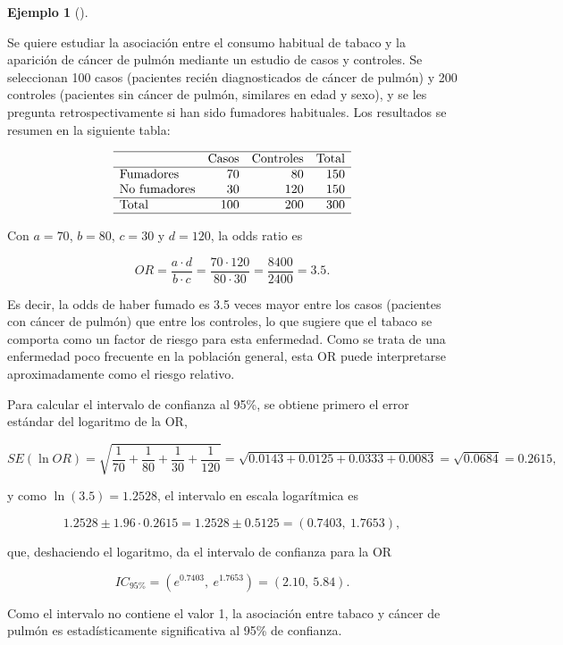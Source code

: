 \documentclass[
  spanish,
  a4paper,
]{scrreport}
\theoremstyle{definition}
\newtheorem{example}{Ejemplo}[chapter]
\theoremstyle{definition}
\theoremstyle{remark}
\begin{document}
\begin{example}[]\protect\hypertarget{exm-casoscontroles-odds-ratio}{}\label{exm-casoscontroles-odds-ratio}

Se quiere estudiar la asociación entre el consumo habitual de tabaco y
la aparición de cáncer de pulmón mediante un estudio de casos y
controles. Se seleccionan 100 casos (pacientes recién diagnosticados de
cáncer de pulmón) y 200 controles (pacientes sin cáncer de pulmón,
similares en edad y sexo), y se les pregunta retrospectivamente si han
sido fumadores habituales. Los resultados se resumen en la siguiente
tabla:

\[
\begin{array}{lrrr}
\hline
 & \mbox{Casos} & \mbox{Controles} & \mbox{Total}\\
\hline
\mbox{Fumadores} & 70 & 80 & 150\\
\mbox{No fumadores} & 30 & 120 & 150\\
\hline
\mbox{Total} & 100 & 200 & 300\\
\hline
\end{array}
\]

Con \(a=70\), \(b=80\), \(c=30\) y \(d=120\), la odds ratio es

\[OR = \frac{a\cdot d}{b\cdot c} = \frac{70\cdot 120}{80\cdot 30} = \frac{8400}{2400} = 3.5.\]

Es decir, la odds de haber fumado es 3.5 veces mayor entre los casos
(pacientes con cáncer de pulmón) que entre los controles, lo que sugiere
que el tabaco se comporta como un factor de riesgo para esta enfermedad.
Como se trata de una enfermedad poco frecuente en la población general,
esta OR puede interpretarse aproximadamente como el riesgo relativo.

Para calcular el intervalo de confianza al 95\%, se obtiene primero el
error estándar del logaritmo de la OR,

\[SE(\ln OR) = \sqrt{\frac{1}{70}+\frac{1}{80}+\frac{1}{30}+\frac{1}{120}} = \sqrt{0.0143+0.0125+0.0333+0.0083} = \sqrt{0.0684} = 0.2615,\]

y como \(\ln(3.5) = 1.2528\), el intervalo en escala logarítmica es

\[1.2528 \pm 1.96\cdot 0.2615 = 1.2528 \pm 0.5125 = (0.7403,\ 1.7653),\]

que, deshaciendo el logaritmo, da el intervalo de confianza para la OR

\[IC_{95\%} = (e^{0.7403},\ e^{1.7653}) = (2.10,\ 5.84).\]

Como el intervalo no contiene el valor 1, la asociación entre tabaco y
cáncer de pulmón es estadísticamente significativa al 95\% de confianza.

\end{example}
\end{document}
